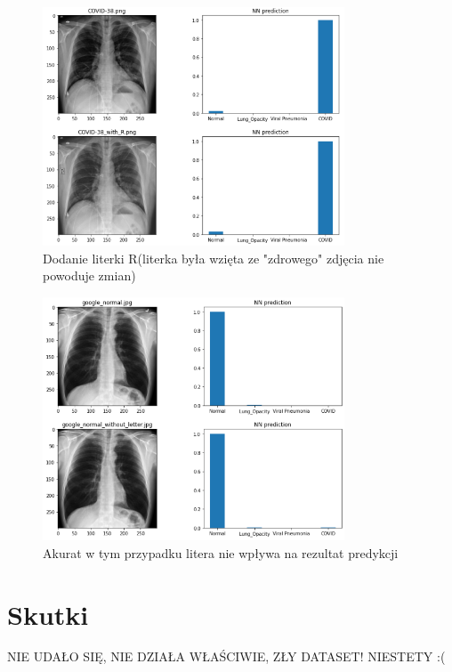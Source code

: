 \documentclass{article}
\begin{document}
\begin{figure}[H]
	\centering
	\includegraphics[width=0.8\textwidth,keepaspectratio=true]{covid_R_exp}
	\caption{Dodanie literki R(literka była wzięta ze "zdrowego" zdjęcia nie powoduje zmian)}
	\label{}
\end{figure}

\begin{figure}[H]
	\centering
	\includegraphics[width=0.8\textwidth,keepaspectratio=true]{google_normal_L_exp}
	\caption{Akurat w tym przypadku litera nie wpływa na rezultat predykcji}
	\label{}
\end{figure}



\section{Skutki}
NIE UDAŁO SIĘ, NIE DZIAŁA WŁAŚCIWIE, ZŁY DATASET! NIESTETY :(


	
\end{document}
